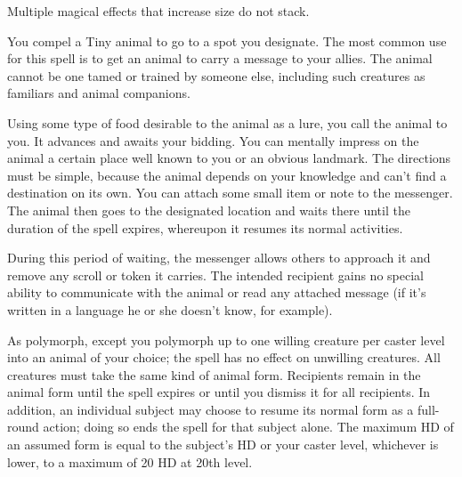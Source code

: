 \begin{multicols}{2}
\begin{small}
\smallskip\noindent Multiple magical effects that increase size do not stack.

\noindent You compel a Tiny animal to go to a spot you designate. The most common use for this spell is to get an animal to carry a message to your allies. The animal cannot be one tamed or trained by someone else, including such creatures as familiars and animal companions.

\smallskip\noindent Using some type of food desirable to the animal as a lure, you call the animal to you. It advances and awaits your bidding. You can mentally impress on the animal a certain place well known to you or an obvious landmark. The directions must be simple, because the animal depends on your knowledge and can't find a destination on its own. You can attach some small item or note to the messenger. The animal then goes to the designated location and waits there until the duration of the spell expires, whereupon it resumes its normal activities.

\smallskip\noindent During this period of waiting, the messenger allows others to approach it and remove any scroll or token it carries. The intended recipient gains no special ability to communicate with the animal or read any attached message (if it's written in a language he or she doesn't know, for example).


\noindent As polymorph, except you polymorph up to one willing creature per caster level into an animal of your choice; the spell has no effect on unwilling creatures. All creatures must take the same kind of animal form. Recipients remain in the animal form until the spell expires or until you dismiss it for all recipients. In addition, an individual subject may choose to resume its normal form as a full-round action; doing so ends the spell for that subject alone. The maximum HD of an assumed form is equal to the subject's HD or your caster level, whichever is lower, to a maximum of 20 HD at 20th level.


\end{small}
\end{multicols}
